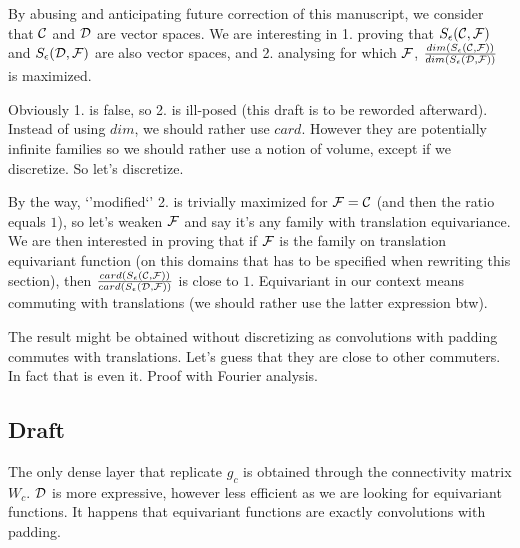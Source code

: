 
By abusing and anticipating future correction of this manuscript, we consider that $\mathcal{C}$ and $\mathcal{D}$ are vector spaces. We are interesting in 1. proving that $S_{\epsilon}(\mathcal{C},\mathcal{F})$ and $S_{\epsilon}(\mathcal{D},\mathcal{F})$ are also vector spaces, and 2. analysing for which $\mathcal{F}$, $\frac{dim(S_{\epsilon}(\mathcal{C},\mathcal{F}))}{dim(S_{\epsilon}(\mathcal{D},\mathcal{F}))}$ is maximized.

Obviously 1. is false, so 2. is ill-posed (this draft is to be reworded afterward). Instead of using $dim$, we should rather use $card$. However they are potentially infinite families so we should rather use a notion of volume, except if we discretize. So let's discretize.

By the way, `'modified`' 2. is trivially maximized for $\mathcal{F} = \mathcal{C}$ (and then the ratio equals $1$), so let's weaken $\mathcal{F}$ and say it's any family with translation equivariance. We are then interested in proving that if $\mathcal{F}$ is the family on translation equivariant function (on this domains that has to be specified when rewriting this section), then $\frac{card(S_{\epsilon}(\mathcal{C},\mathcal{F}))}{card(S_{\epsilon}(\mathcal{D},\mathcal{F}))}$ is close to $1$. Equivariant in our context means commuting with translations (we should rather use the latter expression btw).

The result might be obtained without discretizing as convolutions with padding commutes with translations. Let's guess that they are close to other commuters. In fact that is even it. Proof with Fourier analysis.







\subsection{Draft}

The only dense layer that replicate $g_c$ is obtained through the connectivity matrix $W_c$. $\mathcal{D}$ is more expressive, however less efficient as we are looking for equivariant functions. It happens that equivariant functions are exactly convolutions with padding.


